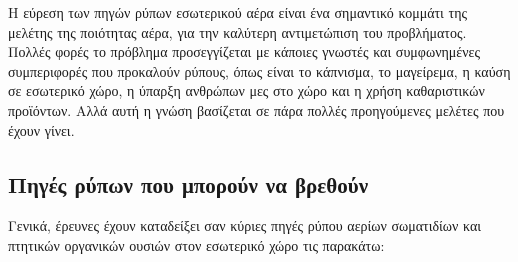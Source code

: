 

Η εύρεση των πηγών ρύπων εσωτερικού αέρα είναι ένα σημαντικό κομμάτι της μελέτης της ποιότητας αέρα, για την καλύτερη αντιμετώπιση του προβλήματος. 
Πολλές φορές το πρόβλημα προσεγγίζεται με κάποιες γνωστές και συμφωνημένες συμπεριφορές που προκαλούν ρύπους, όπως είναι το κάπνισμα, το μαγείρεμα, η καύση σε εσωτερικό χώρο, η ύπαρξη ανθρώπων μες στο χώρο και η χρήση καθαριστικών προϊόντων. 
Αλλά αυτή η γνώση βασίζεται σε πάρα πολλές προηγούμενες μελέτες που έχουν γίνει.

\subsection{Πηγές ρύπων που μπορούν να βρεθούν}
Γενικά, έρευνες έχουν καταδείξει σαν κύριες πηγές ρύπου αερίων σωματιδίων και πτητικών οργανικών ουσιών στον εσωτερικό χώρο τις παρακάτω\cite{SARAGA2023165744}:


